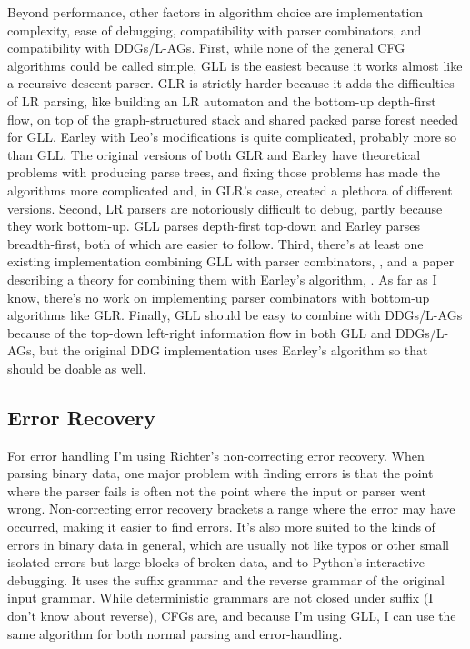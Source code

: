 \documentclass[12pt]{article}
\begin{document}
Beyond performance, other factors in algorithm choice are
implementation complexity, ease of debugging, compatibility with
parser combinators, and compatibility with DDGs/L-AGs.  First, while
none of the general CFG algorithms could be called simple, GLL is the
easiest because it works almost like a recursive-descent parser.  GLR
is strictly harder because it adds the difficulties of LR parsing,
like building an LR automaton and the bottom-up depth-first flow, on
top of the graph-structured stack and shared packed parse forest
needed for GLL.  Earley with Leo's modifications is quite complicated,
probably more so than GLL.  The original versions of both GLR and
Earley have theoretical problems with producing parse trees, and
fixing those problems has made the algorithms more complicated and, in
GLR's case, created a plethora of different versions.  Second, LR
parsers are notoriously difficult to debug, partly because they work
bottom-up.  GLL parses depth-first top-down and Earley parses
breadth-first, both of which are easier to follow.  Third, there's at
least one existing implementation combining GLL with parser
combinators, \textcite{spiewak}, and a paper describing a theory for
combining them with Earley's algorithm, \textcite{earley_combinators}.
As far as I know, there's no work on implementing parser combinators
with bottom-up algorithms like GLR.  Finally, GLL should be easy to
combine with DDGs/L-AGs because of the top-down left-right information
flow in both GLL and DDGs/L-AGs, but the original DDG implementation
uses Earley's algorithm\parencite{yakker1} so that should be doable as
well.



\subsection{Error Recovery}
\label{sec:errors}

For error handling I'm using Richter's non-correcting error recovery.
When parsing binary data, one major problem with finding errors is
that the point where the parser fails is often not the point where the
input or parser went wrong.  Non-correcting error recovery brackets a
range where the error may have occurred, making it easier to find
errors.  It's also more suited to the kinds of errors in binary data
in general, which are usually not like typos or other small isolated
errors but large blocks of broken data, and to Python's interactive
debugging.  It uses the suffix grammar and the reverse grammar of the
original input grammar.  While deterministic grammars are not closed
under suffix (I don't know about reverse), CFGs are, and because I'm
using GLL, I can use the same algorithm for both normal parsing and
error-handling.
\end{document}
